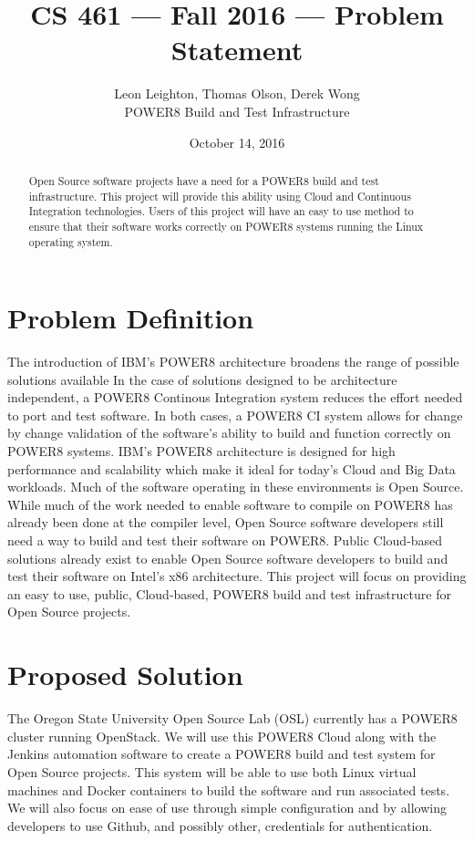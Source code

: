 \documentclass[10pt,letterpaper,onecolumn,draftclsnofoot]{IEEEtran}
\begin{document}
\begin{titlepage}
  \title{CS 461 --- Fall 2016 --- Problem Statement}
  \author{Leon Leighton, Thomas Olson, Derek Wong\\POWER8 Build and Test Infrastructure}
  \date{October 14, 2016}
  \maketitle
  \vspace{4cm}
  \begin{abstract}
  \noindent Open Source software projects have a need for a POWER8 build and test infrastructure.
  This project will provide this ability using Cloud and Continuous Integration technologies. 
  Users of this project will have an easy to use method to ensure that their software works correctly on POWER8 systems running the Linux operating system.
  \end{abstract}
\end{titlepage}

\section*{Problem Definition}
The introduction of IBM's POWER8 architecture broadens the range of possible solutions available
In the case of solutions designed to be architecture independent, a POWER8 Continous Integration system reduces the effort needed to port and test software.  
In both cases, a POWER8 CI system allows for change by change validation of the software's ability to build and function correctly on POWER8 systems. 
IBM's POWER8 architecture is designed for high performance and scalability which make it ideal for today's Cloud and Big Data workloads.
Much of the software operating in these environments is Open Source. 
While much of the work needed to enable software to compile on POWER8 has already been done at the compiler level, Open Source software developers still need a way to build and test their software on POWER8. 
Public Cloud-based solutions already exist to enable Open Source software developers to build and test their software on Intel's x86 architecture. 
This project will focus on providing an easy to use, public, Cloud-based, POWER8 build and test infrastructure for Open Source projects. 


\section*{Proposed Solution}
The Oregon State University Open Source Lab (OSL) currently has a POWER8 cluster running OpenStack.
We will use this POWER8 Cloud along with the Jenkins automation software to create a POWER8 build and test system for Open Source projects. 
This system will be able to use both Linux virtual machines and Docker containers to build the software and run associated tests. 
We will also focus on ease of use through simple configuration and by allowing developers to use Github, and possibly other, credentials for authentication.
\end{document}
